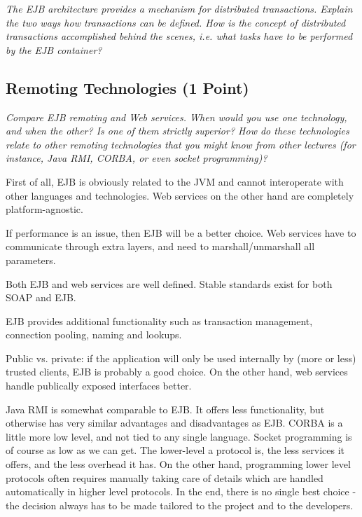 \documentclass[a4paper,10pt]{article}
\begin{document}
\emph{
The EJB architecture provides a mechanism for distributed transactions. Explain the two ways how
transactions can be defined. How is the concept of distributed transactions accomplished behind the
scenes, i.e. what tasks have to be performed by the EJB container?}

\vspace{3mm}

\subsection{Remoting Technologies (1 Point)}

\emph{Compare EJB remoting and Web services. When would you use one technology, and when the other? Is
one of them strictly superior? How do these technologies relate to other remoting technologies that you
might know from other lectures (for instance, Java RMI, CORBA, or even socket programming)?}

\vspace{3mm}

First of all, EJB is obviously related to the JVM and cannot interoperate with other languages
and technologies. Web services on the other hand are completely platform-agnostic.

If performance is an issue, then EJB will be a better choice. Web services have to communicate
through extra layers, and need to marshall/unmarshall all parameters.

Both EJB and web services are well defined. Stable standards exist for both SOAP and EJB.

EJB provides additional functionality such as transaction management, connection pooling, naming and
lookups.

Public vs. private: if the application will only be used internally by (more or less) trusted clients,
EJB is probably a good choice. On the other hand, web services handle publically exposed interfaces better.

Java RMI is somewhat comparable to EJB. It offers less functionality, but otherwise has very similar
advantages and disadvantages as EJB. CORBA is a little more low level, and not tied to any single language.
Socket programming is of course as low as we can get. The lower-level a protocol is, the less services it
offers, and the less overhead it has. On the other hand, programming lower level protocols often requires
manually taking care of details which are handled automatically in higher level protocols. In the end,
there is no single best choice - the decision always has to be made tailored to the project
and to the developers.
\end{document}
